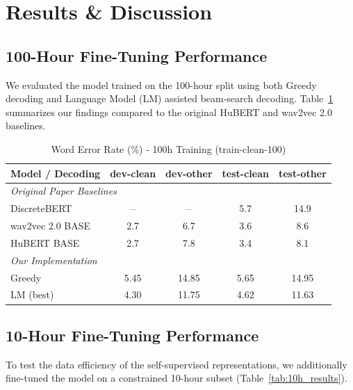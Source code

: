 \documentclass[conference]{IEEEtran}
\begin{document}
\section{Results \& Discussion}

\subsection{100-Hour Fine-Tuning Performance}
We evaluated the model trained on the 100-hour split using both Greedy decoding and Language Model (LM) assisted beam-search decoding.
Table~\ref{tab:100h_results} summarizes our findings compared to the original HuBERT and wav2vec 2.0 baselines.

\begin{table}[htbp]
\caption{Word Error Rate (\%) - 100h Training (train-clean-100)}
\centering
\begin{tabular}{lcccc}
\toprule
\textbf{Model / Decoding} & \textbf{dev-clean} & \textbf{dev-other} & \textbf{test-clean} & \textbf{test-other} \\
\midrule
\multicolumn{5}{l}{\textit{Original Paper Baselines \cite{hubert}}} \\
DiscreteBERT      & --   & --    & 5.7   & 14.9  \\
wav2vec 2.0 BASE  & 2.7  & 6.7   & 3.6   & 8.6   \\
HuBERT BASE       & 2.7  & 7.8   & 3.4   & 8.1   \\
\midrule
\multicolumn{5}{l}{\textit{Our Implementation}} \\
Greedy        & 5.45 & 14.85 & 5.65  & 14.95 \\
LM (best)     & 4.30 & 11.75 & 4.62  & 11.63 \\
\bottomrule
\end{tabular}
\label{tab:100h_results}
\end{table}

\subsection{10-Hour Fine-Tuning Performance}
To test the data efficiency of the self-supervised representations, we additionally fine-tuned the model on a constrained 10-hour subset (Table~\ref{tab:10h_results}).
\end{document}
